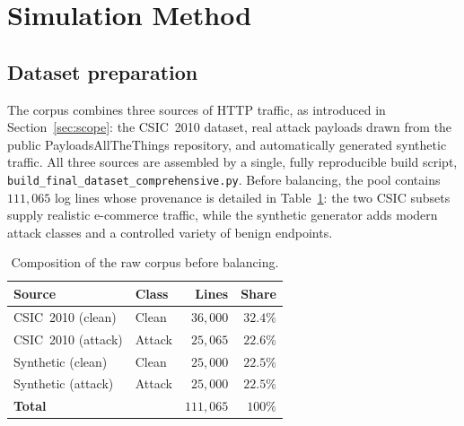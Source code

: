 \documentclass[../main.tex]{subfiles}
\begin{document}
\section{Simulation Method}
\label{sec:sim-method}

\subsection{Dataset preparation}
\label{sec:sim-data}

The corpus combines three sources of HTTP traffic, as introduced in
Section~\ref{sec:scope}: the CSIC~2010 dataset, real attack payloads drawn
from the public PayloadsAllTheThings repository, and automatically generated
synthetic traffic. All three sources are assembled by a single, fully
reproducible build script,
\texttt{build\_\allowbreak final\_\allowbreak dataset\_\allowbreak comprehensive.py}.
Before balancing, the pool contains $111{,}065$ log lines whose provenance is
detailed in Table~\ref{tab:sources}: the two CSIC subsets supply realistic
e-commerce traffic, while the synthetic generator adds modern attack classes
and a controlled variety of benign endpoints.

\begin{table}[H]
  \centering
  \caption{Composition of the raw corpus before balancing.}
  \label{tab:sources}
  \renewcommand{\arraystretch}{1.25}
  \setlength{\tabcolsep}{8pt}
  \footnotesize
  \begin{tabular}{|l|l|r|r|}
    \hline
    \textbf{Source} & \textbf{Class} & \textbf{Lines} & \textbf{Share} \\
    \hline
    CSIC~2010 (clean)   & Clean  & $36{,}000$  & $32.4\%$ \\
    CSIC~2010 (attack)  & Attack & $25{,}065$  & $22.6\%$ \\
    Synthetic (clean)   & Clean  & $25{,}000$  & $22.5\%$ \\
    Synthetic (attack)  & Attack & $25{,}000$  & $22.5\%$ \\
    \hline
    \textbf{Total}      &        & $111{,}065$ & $100\%$ \\
    \hline
  \end{tabular}
\end{table}
\end{document}
